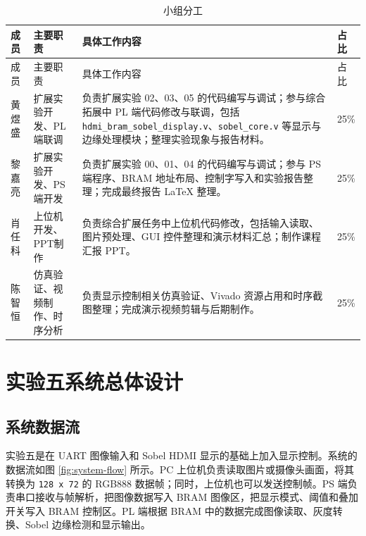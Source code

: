 \documentclass[12pt,a4paper]{ctexart}
\begin{document}
\begin{longtable}{@{}C{0.10\textwidth}C{0.17\textwidth}p{0.50\textwidth}C{0.08\textwidth}@{}}
\caption{小组分工}
\label{tab:division}\\
\toprule
成员 & 主要职责 & 具体工作内容 & 占比 \\
\midrule
\endfirsthead
\toprule
成员 & 主要职责 & 具体工作内容 & 占比 \\
\midrule
\endhead
黄煜盛 & 扩展实验开发、PL端联调 & 负责扩展实验 02、03、05 的代码编写与调试；参与综合拓展中 PL 端代码修改与联调，包括 \verb|hdmi_bram_sobel_display.v|、\verb|sobel_core.v| 等显示与边缘处理模块；整理实验现象与报告材料。 & 25\% \\
\midrule
黎嘉亮 & 扩展实验开发、PS端开发 & 负责扩展实验 00、01、04 的代码编写与调试；参与 PS 端程序、BRAM 地址布局、控制字写入和实验报告整理；完成最终报告 LaTeX 整理。 & 25\% \\
\midrule
肖任科 & 上位机开发、PPT制作 & 负责综合扩展任务中上位机代码修改，包括输入读取、图片预处理、GUI 控件整理和演示材料汇总；制作课程汇报 PPT。 & 25\% \\
\midrule
陈智恒 & 仿真验证、视频制作、时序分析 & 负责显示控制相关仿真验证、Vivado 资源占用和时序截图整理；完成演示视频剪辑与后期制作。 & 25\% \\
\bottomrule
\end{longtable}

\section{实验五系统总体设计}

\subsection{系统数据流}

实验五是在 UART 图像输入和 Sobel HDMI 显示的基础上加入显示控制。系统的数据流如图 \ref{fig:system-flow} 所示。PC 上位机负责读取图片或摄像头画面，将其转换为 \verb|128 x 72| 的 RGB888 数据帧；同时，上位机也可以发送控制帧。PS 端负责串口接收与帧解析，把图像数据写入 BRAM 图像区，把显示模式、阈值和叠加开关写入 BRAM 控制区。PL 端根据 BRAM 中的数据完成图像读取、灰度转换、Sobel 边缘检测和显示输出。
\end{document}
